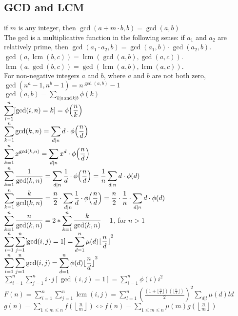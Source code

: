 \subsection{GCD and LCM}
if $m$ is any integer, then $\displaystyle \gcd(a + m {\cdot} b, b) = \gcd(a, b)$ \\
The gcd is a multiplicative function in the following sense: if $\displaystyle a_1$ and $\displaystyle a_2$ are relatively prime, then $\displaystyle \gcd(a_1 \cdot a_2, b) = \gcd(a_1, b) \cdot \gcd(a_2,b )$. \\
$\displaystyle \gcd(a, \operatorname{lcm}(b, c)) = \operatorname{lcm}(\gcd(a, b), \gcd(a, c))$. \\
$\displaystyle \operatorname{lcm}(a, \gcd(b, c)) = \gcd(\operatorname{lcm}(a, b), \operatorname{lcm}(a, c))$. \\
For non-negative integers $\displaystyle a$ and $b$, where $\displaystyle a$ and $b$ are not both zero, $\displaystyle \gcd({n^a} - 1, {n^b} - 1) = n^{\gcd(a,b)} - 1$ \\
$\displaystyle \gcd(a, b) = \displaystyle \sum_{k|a \, \text{and} \, k|b} {\phi(k)}$ \\
$\displaystyle \displaystyle \sum_{i=1}^n [\gcd(i, n) = k] = { \phi{\left(\frac{n}{k}\right)}}$ \\
$\displaystyle \displaystyle \sum_{k=1}^n \gcd(k, n) = \displaystyle \sum_{d|n} d \cdot {\phi{\left(\frac{n}{d}\right)}}$ \\
$\displaystyle \displaystyle \sum_{k=1}^n x^{\gcd(k,n)} = \displaystyle \sum_{d|n} x^d \cdot {\phi{\left(\frac{n}{d}\right)}}$ \\
$\displaystyle \displaystyle \sum_{k=1}^n \frac{1}{\gcd(k, n)} = \displaystyle \sum_{d|n} \frac{1}{d} \cdot {\phi{\left(\frac{n}{d}\right)}} = \frac{1}{n} \displaystyle \sum_{d|n} d \cdot \phi(d)$ \\
$\displaystyle \displaystyle \sum_{k=1}^n \frac{k}{\gcd(k, n)} = \frac{n}{2} \cdot \displaystyle \sum_{d|n} \frac{1}{d} \cdot {\phi{\left(\frac{n}{d}\right)}} = \frac{n}{2} \cdot \frac{1}{n} \cdot \displaystyle \sum_{d|n} d \cdot \phi(d)$ \\
$\displaystyle \displaystyle \sum_{k=1}^n \frac{n}{\gcd(k, n)} = 2 * \displaystyle \sum_{k=1}^n \frac{k}{\gcd(k, n)} - 1$, for $n > 1$ \\
$\displaystyle \displaystyle \sum_{i=1}^n \sum_{j=1}^n [\gcd(i, j) = 1] = \displaystyle \sum_{d=1}^n \mu(d) \lfloor {\frac{n}{d} \rfloor}^2$ \\
$\displaystyle \displaystyle \sum_{i=1}^n \displaystyle\sum_{j=1}^n \gcd(i, j) = \displaystyle \sum_{d=1}^n \phi(d) \lfloor {\frac{n}{d} \rfloor}^2$ \\
$\displaystyle \sum_{i=1}^n \sum_{j=1}^n i \cdot j[\gcd(i, j) = 1] = \sum_{i=1}^n \phi(i)i^2$ \\
$\displaystyle F(n) = \displaystyle \sum_{i=1}^n \displaystyle \sum_{j=1}^n \operatorname{lcm}(i, j) = \displaystyle \sum_{l=1}^n {\left(\frac{\left( 1 + \lfloor{\frac{n}{l} \rfloor} \right) \left( \lfloor{\frac{n}{l} \rfloor} \right)} {2} \right)}^2 \displaystyle \sum_{d|l} \mu(d)ld$ \\ 

 $ g(n) = \sum_{1 \leq m \leq n} f(\left\lfloor\frac{n}{m}\right \rfloor ) \Leftrightarrow f(n) = \sum_{1\leq m\leq n} \mu(m)g(\left\lfloor\frac{n}{m}\right\rfloor)$
